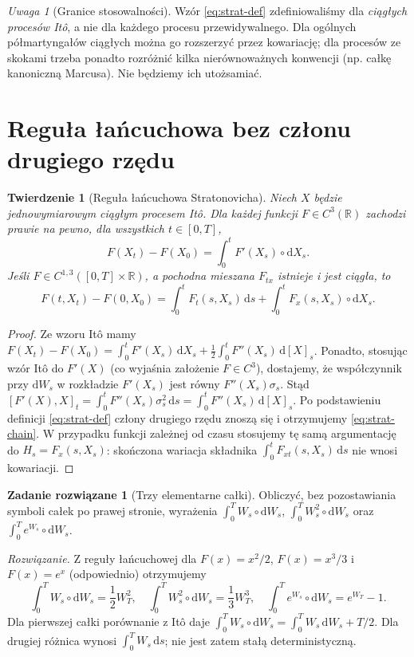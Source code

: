 \documentclass[11pt,a4paper,oneside]{report}
\numberwithin{equation}{chapter}
\theoremstyle{plain}
\newtheorem{twierdzenie}{Twierdzenie}[chapter]
\theoremstyle{definition}
\newtheorem{zadanie}{Zadanie rozwiązane}[chapter]
\theoremstyle{remark}
\newtheorem{uwaga}{Uwaga}[chapter]
\newcommand{\R}{\mathbb{R}}
\newcommand{\dd}{\mathrm{d}}
\begin{document}
\begin{uwaga}[Granice stosowalności]
Wzór \eqref{eq:strat-def} zdefiniowaliśmy dla
\emph{ciągłych procesów Itô}, a nie dla każdego
procesu przewidywalnego. Dla ogólnych
półmartyngałów ciągłych można go rozszerzyć przez
kowariację; dla procesów ze skokami trzeba ponadto
rozróżnić kilka nierównoważnych konwencji (np.
całkę kanoniczną Marcusa). Nie będziemy ich utożsamiać.
\end{uwaga}

\section{Reguła łańcuchowa bez członu drugiego rzędu}\label{sec:volIII:04:03}
\begin{twierdzenie}[Reguła łańcuchowa Stratonovicha]\label{thm:volIII:04:02}
\label{th:strat-chain}
Niech $X$ będzie jednowymiarowym ciągłym procesem
Itô. Dla każdej funkcji $F\in C^3(\R)$ zachodzi
prawie na pewno, dla wszystkich $t\in[0,T]$,
\[
F(X_t)-F(X_0)=\int_0^t F'(X_s)\circ\dd X_s.
\tag{4.5}\label{eq:strat-chain}
\]
Jeśli $F\in C^{1,3}([0,T]\times\R)$, a pochodna mieszana
$F_{tx}$ istnieje i jest ciągła, to
\[
F(t,X_t)-F(0,X_0)
=\int_0^tF_t(s,X_s)\,\dd s
+\int_0^tF_x(s,X_s)\circ\dd X_s.
\tag{4.6}\label{eq:strat-chain-time}
\]
\end{twierdzenie}
\begin{proof}
Ze wzoru Itô mamy
$F(X_t)-F(X_0)=\int_0^tF'(X_s)\,\dd X_s
+\frac12\int_0^tF''(X_s)\,\dd[X]_s$.
Ponadto, stosując wzór Itô do $F'(X)$
(co wyjaśnia założenie $F\in C^3$),
dostajemy, że współczynnik przy $\dd W_s$ w
rozkładzie $F'(X_s)$ jest równy
$F''(X_s)\sigma_s$. Stąd
$[F'(X),X]_t=\int_0^tF''(X_s)\sigma_s^2\,\dd s
=\int_0^tF''(X_s)\,\dd[X]_s$.
Po podstawieniu definicji \eqref{eq:strat-def}
człony drugiego rzędu znoszą się i otrzymujemy
\eqref{eq:strat-chain}. W przypadku funkcji zależnej
od czasu stosujemy tę samą argumentację do
$H_s=F_x(s,X_s)$: skończona wariacja składnika
$\int_0^t F_{xt}(s,X_s)\,\dd s$ nie wnosi kowariacji.
\end{proof}

\begin{zadanie}[Trzy elementarne całki]
Obliczyć, bez pozostawiania symboli całek po prawej
stronie, wyrażenia
$\int_0^TW_s\circ\dd W_s$,
$\int_0^TW_s^2\circ\dd W_s$
oraz $\int_0^Te^{W_s}\circ\dd W_s$.

\emph{Rozwiązanie.} Z reguły łańcuchowej dla
$F(x)=x^2/2$, $F(x)=x^3/3$ i $F(x)=e^x$
(odpowiednio) otrzymujemy
\[
\int_0^TW_s\circ\dd W_s=\frac12W_T^2,
\quad \int_0^TW_s^2\circ\dd W_s=\frac13W_T^3,
\quad \int_0^Te^{W_s}\circ\dd W_s=e^{W_T}-1.
\]
Dla pierwszej całki porównanie z Itô daje
$\int_0^T W_s\circ\dd W_s
=\int_0^TW_s\,\dd W_s+T/2$.
Dla drugiej różnica wynosi $\int_0^TW_s\,\dd s$;
nie jest zatem stałą deterministyczną.
\end{zadanie}
\end{document}

